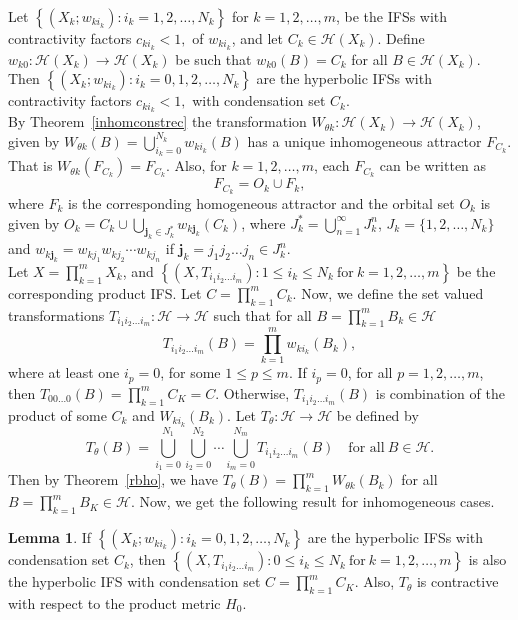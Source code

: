 \documentclass[10pt]{amsart}
\theoremstyle{definition}
\newtheorem{lm}{Lemma}[section]
\begin{document}
	Let $\left\{(X_k;w_{ki_k}):i_k=1,2,\ldots,N_k\right\}$ for $k=1,2,\ldots,m$, be the IFSs with contractivity factors $c_{ki_k}<1,$ of $w_{ki_k}$, and let $C_k\in \mathscr{H}(X_k)$. Define $w_{k0}:\mathscr{H}(X_k)\rightarrow\mathscr{H}(X_k)$ be such that $w_{k0}(B)=C_k$ for all $B\in\mathscr{H}(X_k)$. Then $\left\{(X_k;w_{ki_k}):i_k=0,1,2,\ldots,N_k\right\}$ are the hyperbolic IFSs with contractivity factors $c_{ki_k}<1,$ with condensation set $C_k$.\\
	By Theorem~\ref{inhomconstrec} the transformation $W_{\theta k}:\mathscr{H}(X_k)\rightarrow\mathscr{H}(X_k)$,  given by $W_{\theta k}(B)=\bigcup_{i_k=0}^{N_k}w_{ki_k}(B)$ has a unique inhomogeneous attractor $F_{C_k}$. That is  $W_{\theta k}(F_{C_k})=F_{C_k}$. Also, for $k=1,2,\ldots,m$, each $F_{C_k}$ can be written as
	$$F_{C_k}=O_k\cup F_k,$$
	where $F_k$ is the corresponding homogeneous attractor and the orbital set $O_k$ is given by $O_k=C_k\cup\bigcup_{\textbf{j}_k\in J_k^*} w_{k\textbf{j}_k}(C_k)$, where $J_k^*=\bigcup_{n=1}^{\infty}J_k^n$, $J_k=\{1,2,\ldots,N_k\}$ and $w_{k\textbf{j}_k}=w_{kj_1}w_{kj_2}\cdots w_{kj_n}$ if $\textbf{j}_k=j_1j_2\ldots j_n\in J_k^n$.\\
	Let $X=\prod_{k=1}^mX_k$, and $\left\{(X,T_{i_1i_2\ldots i_m}):1\leq i_k\leq N_k~\mbox{for}~k=1,2,\ldots,m\right\}$ be the corresponding product IFS. Let $C=\prod_{k=1}^mC_k$. Now, we define the set valued transformations $T_{i_1i_2\ldots i_m}:\mathscr{H}\rightarrow\mathscr{H}$ such that for all $B=\prod_{k=1}^mB_k\in\mathscr{H}$
	$$T_{i_1i_2\ldots i_m}(B)=\prod_{k=1}^mw_{ki_k}(B_k),$$
	where at least one $i_p=0$, for some $1\leq p\leq m$. If $i_p=0$, for all $p=1,2,\ldots,m$, then $T_{00\ldots 0}(B)=\prod_{k=1}^mC_K=C$. Otherwise, $T_{i_1i_2\ldots i_m}(B)$ is combination of the product of some $C_k$ and $W_{ki_k}(B_k)$. Let $T_{\theta}:\mathscr{H}\rightarrow\mathscr{H}$ be defined by
	$$T_{\theta}(B)=\bigcup_{i_1=0}^{N_1}\bigcup_{i_2=0}^{N_2}\cdots\bigcup_{i_m=0}^{N_m}T_{i_1i_2\ldots i_m}(B)\quad \mbox{for all}~B\in\mathscr{H}.$$
	Then by Theorem~\ref{rbho}, we have $T_{\theta}(B)=\prod_{k=1}^mW_{\theta k}(B_k)$ for all $B=\prod_{k=1}^mB_K\in\mathscr{H}.$ Now, we get the following result for inhomogeneous cases.
	\begin{lm}
		If $\left\{(X_k;w_{ki_k}):i_k=0,1,2,\ldots,N_k\right\}$ are the hyperbolic IFSs with condensation set $C_k$, then $\left\{(X,T_{i_1i_2\ldots i_m}):0\leq i_k\leq N_k~\mbox{for}~k=1,2,\ldots,m\right\}$ is also the hyperbolic IFS with condensation set $C=\prod_{k=1}^mC_K$. Also, $T_{\theta}$ is contractive with respect to the product metric $H_0$.
	\end{lm}
\end{document}
